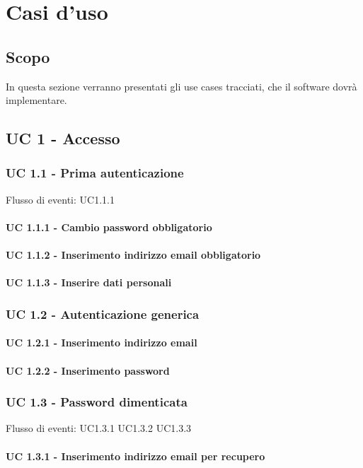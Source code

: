 \section{Casi d'uso}
\subsection{Scopo}
In questa sezione verranno presentati gli use cases tracciati, che il software dovrà implementare.
\subsection*{UC 1 - Accesso}
    \subsubsection*{UC 1.1 - Prima autenticazione}
    Flusso di eventi: UC1.1.1
        \paragraph*{UC 1.1.1 - Cambio password obbligatorio}
        \paragraph*{UC 1.1.2 - Inserimento indirizzo email obbligatorio}
        \paragraph*{UC 1.1.3 - Inserire dati personali}
    \subsubsection*{UC 1.2 - Autenticazione generica}
        \paragraph*{UC 1.2.1 - Inserimento indirizzo email}
        \paragraph*{UC 1.2.2 - Inserimento password}
    \subsubsection*{UC 1.3 - Password dimenticata}
    Flusso di eventi: UC1.3.1 UC1.3.2 UC1.3.3
        \paragraph*{UC 1.3.1 - Inserimento indirizzo email per recupero}
